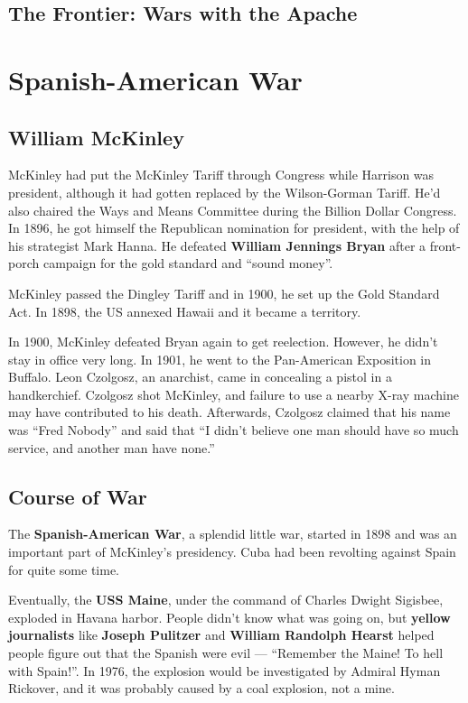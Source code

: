 \subsection*{The Frontier: Wars with the Apache}

\section{Spanish-American War}

\subsection*{William McKinley}

McKinley had put the McKinley Tariff through Congress while Harrison was president,
although it had gotten replaced by the Wilson-Gorman Tariff.
He'd also chaired the Ways and Means Committee during the Billion Dollar Congress.
In 1896, he got himself the Republican nomination for president,
with the help of his strategist Mark Hanna.
He defeated \textbf{William Jennings Bryan} after a front-porch campaign for the gold standard and ``sound money''.

McKinley passed the Dingley Tariff and in 1900, he set up the Gold Standard Act.
In 1898, the US annexed Hawaii and it became a territory.

In 1900, McKinley defeated Bryan again to get reelection.
However, he didn't stay in office very long.
In 1901, he went to the Pan-American Exposition in Buffalo.
Leon Czolgosz, an anarchist, came in concealing a pistol in a handkerchief.
Czolgosz shot McKinley, and failure to use a nearby X-ray machine may have contributed to his death.
Afterwards, Czolgosz claimed that his name was ``Fred Nobody''
and said that ``I didn't believe one man should have so much service, and another man have none.''

\subsection*{Course of War}

The \textbf{Spanish-American War}, a splendid little war,
started in 1898 and was an important part of McKinley's presidency.
Cuba had been revolting against Spain for quite some time.

Eventually, the \textbf{USS Maine}, under the command of Charles Dwight Sigisbee, exploded in Havana harbor.
People didn't know what was going on,
but \textbf{yellow journalists} like \textbf{Joseph Pulitzer} and \textbf{William Randolph Hearst}
helped people figure out that the Spanish were evil ---
``Remember the Maine! To hell with Spain!''.
In 1976, the explosion would be investigated by Admiral Hyman Rickover,
and it was probably caused by a coal explosion, not a mine.

